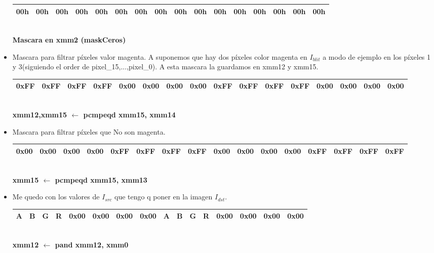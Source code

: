 \begin{itemize}
		\begin{center}
		   \begin{tabular}{| c | c | c | c || c | c | c | c || c | c | c | c || c | c | c | c |}
			 \hline
			 00h & 00h & 00h & 00h & 00h & 00h & 00h & 00h & 00h & 00h & 00h & 00h & 00h & 00h & 00h & 00h \\ \hline
		   \end{tabular}
		   \\ \textbf{Mascara en xmm2 (maskCeros)}
		\end{center}
		
	\item Mascara para filtrar píxeles valor magenta. A suponemos que hay dos píxeles color magenta en $I_{blit}$ a modo de ejemplo en los píxeles 1 y 3(siguiendo el order de pixel_15,...,pixel_0). A esta mascara la guardamos en xmm12 y xmm15.
	
		\begin{center}
		   \begin{tabular}{| c | c | c | c || c | c | c | c || c | c | c | c || c | c | c | c |}
			 \hline
			 0xFF & 0xFF & 0xFF & 0xFF & 0x00 & 0x00 & 0x00 & 0x00 & 0xFF & 0xFF & 0xFF & 0xFF & 0x00 & 0x00 & 0x00 & 0x00 \\ \hline
		   \end{tabular}
		   \\ \textbf{xmm12,xmm15 $\gets$ pcmpeqd xmm15, xmm14}
		\end{center}

	\item Mascara para filtrar píxeles que No son magenta.

		\begin{center}
		   \begin{tabular}{| c | c | c | c || c | c | c | c || c | c | c | c || c | c | c | c |}
			 \hline
			 0x00 & 0x00 & 0x00 & 0x00 & 0xFF & 0xFF & 0xFF & 0xFF & 0x00 & 0x00 & 0x00 & 0x00 & 0xFF & 0xFF & 0xFF & 0xFF \\ \hline
		   \end{tabular}
		   \\ \textbf{xmm15 $\gets$ pcmpeqd xmm15, xmm13}
		\end{center}

	\item  Me quedo con los valores de $I_{src}$ que tengo q poner en la imagen $I_{dst}$.
		\begin{center}
		   \begin{tabular}{| c | c | c | c || c | c | c | c || c | c | c | c || c | c | c | c |}
			 \hline
			 A & B & G & R & 0x00 & 0x00 & 0x00 & 0x00 & A & B & G & R & 0x00 & 0x00 & 0x00 & 0x00 \\ \hline
		   \end{tabular}
		   \\ \textbf{xmm12 $\gets$ pand xmm12, xmm0}
		\end{center}		


\end{itemize}

